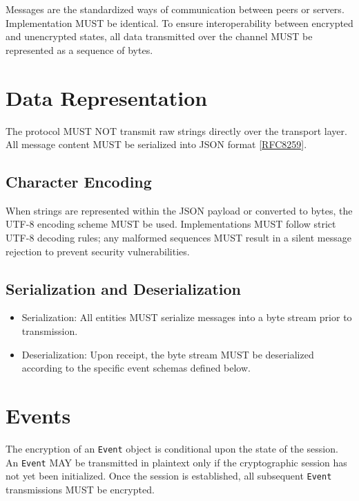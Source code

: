 Messages are the standardized ways of communication between peers or servers. 
Implementation MUST be identical. To ensure interoperability between encrypted
and unencrypted states, all data transmitted over the channel MUST be 
represented as a sequence of bytes.

\section{Data Representation}

The protocol MUST NOT transmit raw strings directly over the transport layer.
All message content MUST be serialized into JSON format
[\href{https://datatracker.ietf.org/doc/html/rfc8259}{RFC8259}].
\nocite{rfc8259}

\subsection{Character Encoding}

When strings are represented within the JSON payload or converted to bytes, the
UTF-8 encoding scheme MUST be used. Implementations MUST follow strict UTF-8
decoding rules; any malformed sequences MUST result in a silent message
rejection to prevent security vulnerabilities.

\subsection{Serialization and Deserialization}

\begin{itemize}
    \item Serialization: All entities MUST serialize messages into a byte
        stream prior to transmission.
    \item Deserialization: Upon receipt, the byte stream MUST be deserialized
        according to the specific event schemas defined below.
\end{itemize}

\section{Events}

The encryption of an \texttt{Event} object is conditional upon the state of the
session. An \texttt{Event} MAY be transmitted in plaintext only if the
cryptographic session has not yet been initialized. Once the session is
established, all subsequent \texttt{Event} transmissions MUST be encrypted.
\bigskip

